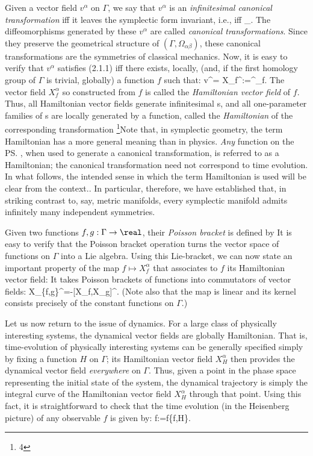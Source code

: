 Given a vector field $v^\alpha$ on $\Gamma$, we say that $v^\alpha$ is an {\it
infinitesimal canonical transformation} iff it leaves the symplectic form
invariant, i.e., iff
\bneq
{}\Omega_.
The diffeomorphisms generated by these $v^\alpha$ are called {\it canonical
transformations}. Since they preserve the geometrical structure of $(\Gamma,
\Omega_{\alpha\beta})$, these canonical  transformations are the symmetries
of classical mechanics. Now, it is easy to verify that $v^\alpha$ satisfies
(2.1.1) iff there exists, locally, (and, if the first homology group of
$\Gamma$ is trivial, globally) a function $f$ such that:
\bneq
v^\alpha = X_f^\alpha:=\Omega^\ab\nab_\beta f.
The vector field $X_f^\alpha$ so constructed from $f$ is called the {\it
Hamiltonian vector field} of $f$. Thus, all Hamiltonian vector fields generate
infinitesimal \ct s, and all one-parameter families of \ct s are locally
generated by a function, called the {\it Hamiltonian} of the corresponding
transformation%
\footnote{4}{Note that, in symplectic geometry, the term Hamiltonian
has a more general meaning than in physics. {\it Any} function on the
\ps, when used to generate a canonical transformation, is referred to as
a Hamiltonian; the canonical transformation need not correspond to time
evolution. In what follows, the intended sense in which the term
Hamiltonian is used will be clear from the context.}.
In particular, therefore, we have established that, in striking contrast
to, say, metric manifolds, every symplectic manifold admits infinitely many
independent symmetries.

Given two functions $f,g:\Gamma\to\real$, their {\it Poisson bracket} is
defined by
It is easy to verify that the Poisson bracket operation turns the vector
space of functions on $\Gamma$ into a Lie algebra. Using this Lie-bracket,
we can now state an important property of the map $f\mapsto X_f^\alpha$
that associates to $f$ its Hamiltonian vector field: It takes Poisson
brackets of functions into commutators of vector fields:
\bneq
X_{\{f,g\}}^\alpha=-[X_f,X_g]^\alpha.
(Note also that the map is linear and its kernel consists precisely of the
constant functions on $\Gamma$.)

Let us now return to the issue of dynamics. For a large class of physically
interesting systems, the dynamical vector fields are globally Hamiltonian.
That is, time-evolution of physically interesting systems can be generally
specified simply by fixing a function $H$ on $\Gamma$; its Hamiltonian vector
field $X_H^\alpha$ then provides the dynamical vector field {\it everywhere}
on $\Gamma$. Thus, given a point in the phase space representing the initial
state of the system, the dynamical trajectory is simply the integral curve of
the Hamiltonian vector field $X_H^\alpha$ through that point. Using this fact,
it is straightforward to check that the time evolution (in the Heisenberg
picture) of any observable $f$ is given by:
\bneq
\dot f:=f\equiv\{f,H\}.

